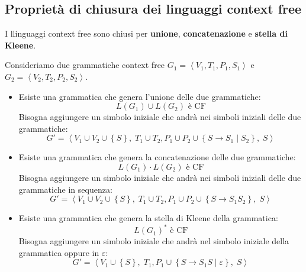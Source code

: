\documentclass[a4paper]{article}
\begin{document}
\subsection{Proprietà di chiusura dei linguaggi context free}
\begin{theorem}
  I llinguaggi context free sono chiusi per \textbf{unione}, \textbf{concatenazione} e
  \textbf{stella di Kleene}.

  Consideriamo due grammatiche context free \( G_1 = \left< V_1, T_1, P_1, S_1 \right> \)
  e \( G_2 = \left< V_2, T_2, P_2, S_2 \right> \). 

  \begin{itemize}
    \item 
      Esiste una grammatica che genera
      l'unione delle due grammatiche:
      \[
        L(G_1) \cup L(G_2) \text{ è CF}
      \] 
      Bisogna aggiungere un simbolo iniziale che andrà nei simboli iniziali delle due grammatiche:
      \[
        G' = \left< V_1 \cup V_2 \cup \left\{ S \right\},\; T_1 \cup T_2, P_1 \cup P_2 \cup
        \left\{ S \to S_1 \;|\; S_2 \right\},\; S \right>
      \] 

    \item Esiste una grammatica che genera la concatenazione delle due grammatiche:
      \[
        L(G_1) \cdot L(G_2) \text{ è CF}
      \] 
      Bisogna aggiungere un simbolo iniziale che andrà nei simboli iniziali delle due grammatiche
      in sequenza:
      \[
        G' = \left< V_1 \cup V_2 \cup \left\{ S \right\},\; T_1 \cup T_2, P_1 \cup P_2 \cup
        \left\{ S \to S_1 S_2 \right\},\; S \right>
      \]

    \item Esiste una grammatica che genera la stella di Kleene della grammatica:
      \[
        L(G_1)^* \text{ è CF}
      \]
      Bisogna aggiungere un simbolo iniziale che andrà nel simbolo iniziale della grammatica
      oppure in \( \varepsilon  \):
      \[
        G' = \left< V_1 \cup \left\{ S \right\},\; T_1, P_1 \cup
        \left\{ S \to S_1 S \;|\; \varepsilon  \right\},\; S \right>
      \]
  \end{itemize}
\end{theorem}
\end{document}
